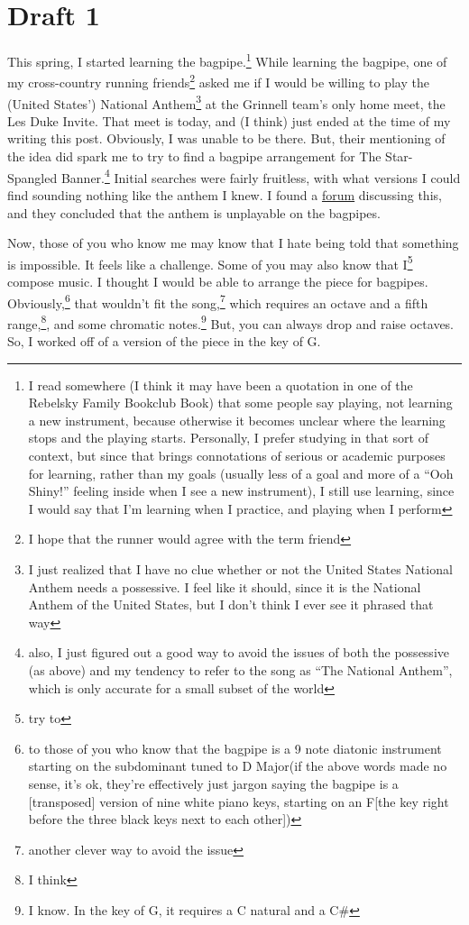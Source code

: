 \documentclass[12pt]{article}[titlepage]
\newcommand{\say}[1]{``#1''}
\newcommand{\1}{\={a}}
\newcommand{\2}{\={e}}
\newcommand{\3}{\={\i}}
\newcommand{\4}{\=o}
\newcommand{\5}{\=u}
\newcommand{\6}{\={A}}
\renewcommand{\,}{\textsuperscript{,}}
\begin{document}
\section{Draft 1}
This spring, I started learning the bagpipe.\footnote{I read somewhere (I think it may have been a quotation in one of the Rebelsky Family Bookclub Book) that some people say playing, not learning a new instrument, because otherwise it becomes unclear where the learning stops and the playing starts. Personally, I prefer studying in that sort of context, but since that brings connotations of serious or academic purposes for learning, rather than my goals (usually less of a goal and more of a \say{Ooh Shiny!} feeling inside when I see a new instrument), I still use learning, since I would say that I'm learning when I practice, and playing when I perform}
While learning the bagpipe, one of my cross-country running friends\footnote{I hope that the runner would agree with the term friend} asked me if I would be willing to play the (United States') National Anthem\footnote{I just realized that I have no clue whether or not the United States National Anthem needs a possessive. I feel like it should, since it is the National Anthem of the United States, but I don't think I ever see it phrased that way} at the Grinnell team's only home meet, the Les Duke Invite.
That meet is today, and (I think) just ended at the time of my writing this post.
Obviously, I was unable to be there.
But, their mentioning of the idea did spark me to try to find a bagpipe arrangement for The Star-Spangled Banner.\footnote{also, I just figured out a good way to avoid the issues of both the possessive (as above) and my tendency to refer to the song as \say{The National Anthem}, which is only accurate for a small subset of the world}
Initial searches were fairly fruitless, with what versions I could find sounding nothing like the anthem I knew.
I found a \href{http://www.therealviperpiper.com/viewtopic.php?t=11731}{forum} discussing this, and they concluded that the anthem is unplayable on the bagpipes.

Now, those of you who know me may know that I hate being told that something is impossible.
It feels like a challenge.
Some of you may also know that I\footnote{try to} compose music.
I thought I would be able to arrange the piece for bagpipes.
Obviously,\footnote{to those of you who know that the bagpipe is a 9 note diatonic instrument starting on the subdominant tuned to D Major(if the above words made no sense, it's ok, they're effectively just jargon saying the bagpipe is a [transposed] version of nine white piano keys, starting on an F[the key right before the three black keys next to each other])}
that wouldn't fit the song,\footnote{another clever way to avoid the issue} which requires an octave and a fifth range,\footnote{I think}, and some chromatic notes.\footnote{I know. In the key of G, it requires a C natural and a C\#}
But, you can always drop and raise octaves.
So, I worked off of a version of the piece in the key of G.
\end{document}

